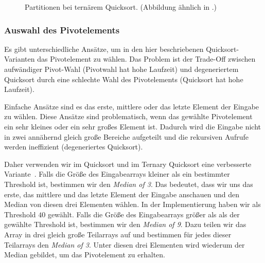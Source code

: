 \begin{figure}[!h]
	\centering
	\caption[Partitionen bei ternärem Quicksort]{Partitionen bei ternärem Quicksort. (Abbildung ähnlich in \cite{ternary_quicksort}.)}
	\label{fg:ternary_partitions}
\end{figure}

\subsubsection{Auswahl des Pivotelements}

Es gibt unterschiedliche Ansätze, um in den hier beschriebenen Quicksort- Varianten das Pivotelement zu wählen.
Das Problem ist der Trade-Off zwischen aufwändiger Pivot-Wahl (Pivotwahl hat hohe Laufzeit) und
degeneriertem Quicksort durch eine schlechte Wahl des Pivotelements (Quicksort hat hohe Laufzeit).

Einfache Ansätze sind es das erste, mittlere oder das letzte Element der Eingabe zu wählen.
Diese Ansätze sind problematisch, wenn das gewählte Pivotelement ein sehr kleines oder ein sehr großes Element ist.
Dadurch wird die Eingabe nicht in zwei annähernd gleich große Bereiche aufgeteilt und
die rekursiven Aufrufe werden ineffizient (degeneriertes Quicksort).

Daher verwenden wir im Quicksort und im Ternary Quicksort eine verbesserte Variante~\cite{ternary_quicksort}.
Falls die Größe des Eingabearrays kleiner als ein bestimmter Threshold ist,
bestimmen wir den \emph{Median of 3}. Das bedeutet, dass wir uns das erste,
das mittlere und das letzte Element der Eingabe anschauen und den Median von diesen drei Elementen wählen.
In der Implementierung haben wir als Threshold $40$ gewählt.
Falls die Größe des Eingabearrays größer als als der gewählte Threshold ist,
bestimmen wir den \emph{Median of 9}. Dazu teilen wir das Array in drei gleich große Teilarrays auf
und bestimmen für jedes dieser Teilarrays den \emph{Median of 3}.
Unter diesen drei Elementen wird wiederum der Median gebildet, um das Pivotelement zu erhalten.